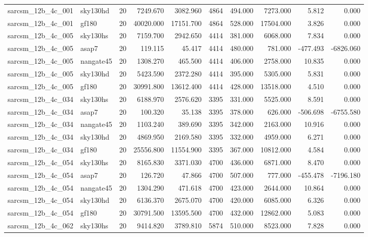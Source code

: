 \begin{tabular}{llrrrrrrrr}
sarcsm\_12b\_4c\_001 & sky130hd & 20 & 7249.670 & 3082.960 & 4864 & 494.000 & 7273.000 & 5.812 & 0.000 \\
sarcsm\_12b\_4c\_001 & gf180 & 20 & 40020.000 & 17151.700 & 4864 & 528.000 & 17504.000 & 3.826 & 0.000 \\
sarcsm\_12b\_4c\_005 & sky130hs & 20 & 7159.700 & 2942.650 & 4414 & 381.000 & 6068.000 & 7.834 & 0.000 \\
sarcsm\_12b\_4c\_005 & asap7 & 20 & 119.115 & 45.417 & 4414 & 480.000 & 781.000 & -477.493 & -6826.060 \\
sarcsm\_12b\_4c\_005 & nangate45 & 20 & 1308.270 & 465.500 & 4414 & 406.000 & 2758.000 & 10.835 & 0.000 \\
sarcsm\_12b\_4c\_005 & sky130hd & 20 & 5423.590 & 2372.280 & 4414 & 395.000 & 5305.000 & 5.831 & 0.000 \\
sarcsm\_12b\_4c\_005 & gf180 & 20 & 30991.800 & 13612.400 & 4414 & 428.000 & 13518.000 & 4.510 & 0.000 \\
sarcsm\_12b\_4c\_034 & sky130hs & 20 & 6188.970 & 2576.620 & 3395 & 331.000 & 5525.000 & 8.591 & 0.000 \\
sarcsm\_12b\_4c\_034 & asap7 & 20 & 100.320 & 35.138 & 3395 & 378.000 & 626.000 & -506.698 & -6755.580 \\
sarcsm\_12b\_4c\_034 & nangate45 & 20 & 1103.240 & 389.690 & 3395 & 342.000 & 2163.000 & 10.916 & 0.000 \\
sarcsm\_12b\_4c\_034 & sky130hd & 20 & 4869.950 & 2169.580 & 3395 & 332.000 & 4959.000 & 6.271 & 0.000 \\
sarcsm\_12b\_4c\_034 & gf180 & 20 & 25556.800 & 11554.900 & 3395 & 367.000 & 10812.000 & 4.584 & 0.000 \\
sarcsm\_12b\_4c\_054 & sky130hs & 20 & 8165.830 & 3371.030 & 4700 & 436.000 & 6871.000 & 8.470 & 0.000 \\
sarcsm\_12b\_4c\_054 & asap7 & 20 & 126.720 & 47.866 & 4700 & 507.000 & 777.000 & -455.478 & -7196.180 \\
sarcsm\_12b\_4c\_054 & nangate45 & 20 & 1304.290 & 471.618 & 4700 & 423.000 & 2644.000 & 10.864 & 0.000 \\
sarcsm\_12b\_4c\_054 & sky130hd & 20 & 6136.370 & 2675.070 & 4700 & 420.000 & 6085.000 & 6.326 & 0.000 \\
sarcsm\_12b\_4c\_054 & gf180 & 20 & 30791.500 & 13595.500 & 4700 & 432.000 & 12862.000 & 5.083 & 0.000 \\
sarcsm\_12b\_4c\_062 & sky130hs & 20 & 9414.820 & 3789.810 & 5874 & 510.000 & 8523.000 & 7.828 & 0.000 \\

\end{tabular}
